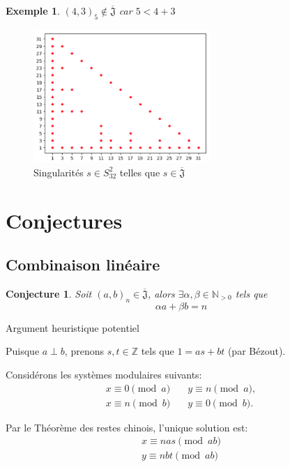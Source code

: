 \documentclass{article}
\newtheorem{conjecture}{Conjecture}
\newtheorem{example}{Exemple}
\newcommand{\J}{\mathfrak{J}}
\newcommand{\JS}{\overline{\J}}
\begin{document}
\begin{example}
    ${(4, 3)}_5 \not \in \JS$ car $5 < 4 + 3$
\end{example}

\begin{figure}[h]
    \caption{Singularités $s \in S_{32}^2$ telles que $s \in \JS$}
    \centering
    \includegraphics[width=0.6\textwidth]{singularite_j_strict_m2_n32}
\end{figure}

\newpage

\section{Conjectures}

\subsection{Combinaison linéaire}

\begin{conjecture}
    Soit ${(a, b)}_n \in \JS$, alors $\exists \alpha, \beta \in \mathbb{N}_{>0}$ tels que
    \[ \alpha a + \beta b = n \]
\end{conjecture}

Argument heuristique potentiel

Puisque $a \perp b$, prenons $s, t \in \mathbb{Z}$ tels que $1 = as + bt$ (par Bézout).

Considérons les systèmes modulaires suivants:
\begin{align*}
    x \equiv 0 \pmod a &\quad y \equiv n \pmod a, \\
    x \equiv n \pmod b &\quad y \equiv 0 \pmod b.
\end{align*}

Par le Théorème des restes chinois, l'unique solution est:
\begin{align*}
    x \equiv nas \pmod {ab} \\
    y \equiv nbt \pmod {ab}
\end{align*}
\end{document}
